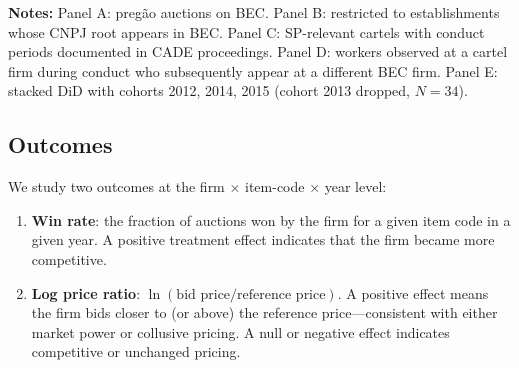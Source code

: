 \begin{table}[htbp]
\begin{tabular}{lrl}
\bottomrule
\end{tabular}
\vspace{0.5em}
\begin{minipage}{0.90\textwidth}
\scriptsize{\textbf{Notes:} Panel A: preg\~{a}o auctions on BEC. Panel B: restricted to establishments whose CNPJ root appears in BEC. Panel C: SP-relevant cartels with conduct periods documented in CADE proceedings. Panel D: workers observed at a cartel firm during conduct who subsequently appear at a different BEC firm. Panel E: stacked DiD with cohorts 2012, 2014, 2015 (cohort 2013 dropped, $N = 34$).\par}
\end{minipage}
\end{table}

\subsection{Outcomes}

We study two outcomes at the firm $\times$ item-code $\times$ year level:

\begin{enumerate}
\item \textbf{Win rate}: the fraction of auctions won by the firm for a given item code in a given year. A positive treatment effect indicates that the firm became more competitive.

\item \textbf{Log price ratio}: $\ln(\text{bid price} / \text{reference price})$. A positive effect means the firm bids closer to (or above) the reference price---consistent with either market power or collusive pricing. A null or negative effect indicates competitive or unchanged pricing.
\end{enumerate}
